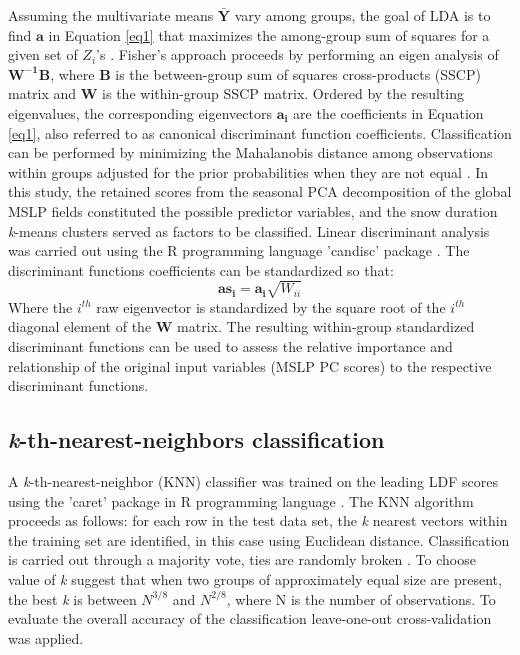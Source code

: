 \documentclass{tATO2e}
\begin{document}
Assuming the multivariate means $\mathbf{\bar{Y}}$ vary among groups, the goal of LDA is to find $\mathbf{a}$ in Equation \ref{eq1} that maximizes the among-group sum of squares for a given set of $Z_{i}$'s \citep{Gotelli2013}. Fisher’s approach proceeds by performing an eigen analysis of $\mathbf{W^{-1}B}$, where $\mathbf{B}$ is the between-group sum of squares cross-products (SSCP) matrix and $\mathbf{W}$ is the within-group SSCP matrix. Ordered by the resulting eigenvalues, the corresponding eigenvectors $\bm{a_{i}}$ are the coefficients in Equation \ref{eq1}, also referred to as canonical discriminant function coefficients. Classification can be performed by minimizing the Mahalanobis distance among observations within groups adjusted for the prior probabilities when they are not equal \citep{Venables2002}. In this study, the retained scores from the seasonal PCA decomposition of the global MSLP fields constituted the possible predictor variables, and the snow duration \textit{k}-means clusters served as factors to be classified. Linear discriminant analysis was carried out using the R programming language 'candisc' package \citep{r_candisc}. The discriminant functions coefficients can be standardized so that:
\begin{equation}
\bm a \bm s_{\bm i} = \bm a_{\bm i}\sqrt{W_{ii}}
\label{eq2}
\end{equation}
Where the $i^{th}$ raw eigenvector is standardized by the square root of the $i^{th}$ diagonal element of the $\mathbf{W}$ matrix. The resulting within-group standardized discriminant functions can be used to assess the relative importance and relationship of the original input variables (MSLP PC scores) to the respective discriminant functions. 


\subsection{\textit{k}-th-nearest-neighbors classification}\label{stepwise}
A \textit{k}-th-nearest-neighbor (KNN) classifier was trained on the leading LDF scores using the 'caret' package in R programming language \citep{r_caret}. The KNN algorithm proceeds as follows: for each row in the test data set, the \textit{k} nearest vectors within the training set are identified, in this case using Euclidean distance. Classification is carried out through a majority vote, ties are randomly broken \citep{Venables2002}. To choose value of \textit{k} \cite{EnasChoi1986} suggest that when two groups of approximately equal size are present, the best \textit{k} is between $N^{3/8}$ and $N^{2/8}$, where N is the number of observations. To evaluate the overall accuracy of the classification leave-one-out cross-validation was applied. 
\end{document}
